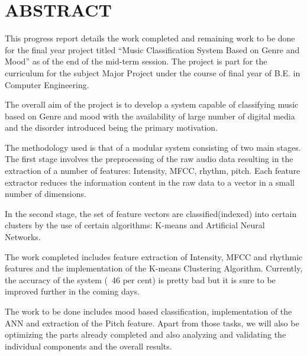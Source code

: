 \newpage
\section*{ABSTRACT}

This progress report details the work completed and remaining work to be done for the final year project titled “Music Classification System
Based on Genre and Mood” as of the end of the mid-term session. The project is part for the curriculum for the subject Major Project under
the course of final year of B.E. in Computer Engineering.
\par The overall aim of the project is to develop a system capable of classifying music based on Genre and mood with the availability of large
number of digital media and the disorder introduced being the primary motivation.  
\par The methodology used is that of a modular system consisting of two main stages. The first stage involves the preprocessing of the raw audio
data resulting in the extraction of a number of features: Intensity, MFCC, rhythm, pitch. Each feature extractor reduces the information content
in the raw data to a vector in a small number of dimensions. 
\par In the second stage, the set of feature vectors are classified(indexed) into certain clusters by the use of certain algorithms: K-means and
Artificial Neural Networks. 
\par The work completed includes feature extraction of Intensity, MFCC and rhythmic features and the implementation of the K-means Clustering Algorithm.
Currently, the accuracy of the system (~46 per cent) is pretty bad but it is sure to be improved further in the coming days.
\par The work to be done includes mood based classification, implementation of the ANN and extraction of the Pitch feature. Apart from those
tasks, we will also be optimizing the parts already completed and also analyzing and validating the individual components and the overall
results.\\


